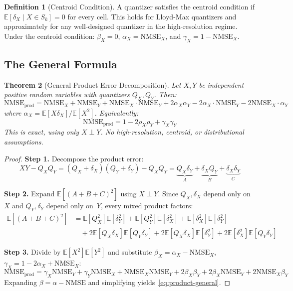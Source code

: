 \documentclass[11pt,letterpaper]{article}
\newtheorem{theorem}{Theorem}[section]
\theoremstyle{definition}
\newtheorem{definition}[theorem]{Definition}
\theoremstyle{remark}
\newcommand{\NMSE}{\mathrm{NMSE}}
\newcommand{\E}{\mathbb{E}}
\begin{document}
\begin{definition}[Centroid Condition]
\label{def:centroid}
A quantizer satisfies the centroid condition if
$\E[\delta_X \mid X \in S_k] = 0$ for every cell.
This holds for Lloyd-Max quantizers and approximately for any well-designed
quantizer in the high-resolution regime.
Under the centroid condition:
$\beta_X = 0$, $\alpha_X = \NMSE_X$, and $\gamma_X = 1 - \NMSE_X$.
\end{definition}

\subsection{The General Formula}

\begin{theorem}[General Product Error Decomposition]
\label{thm:product-general}
Let $X, Y$ be independent positive random variables with quantizers
$Q_X, Q_Y$.
Then:
\begin{equation}
  \boxed{\NMSE_{\mathrm{prod}} = \NMSE_X + \NMSE_Y + \NMSE_X \cdot \NMSE_Y
  + 2\alpha_X \alpha_Y
  - 2\alpha_X \cdot \NMSE_Y - 2\NMSE_X \cdot \alpha_Y}
  \label{eq:product-general}
\end{equation}
where $\alpha_X = \E[X\delta_X]/\E[X^2]$.
Equivalently:
\begin{equation}
  \NMSE_{\mathrm{prod}} = 1 - 2\rho_X \rho_Y + \gamma_X \gamma_Y
  \label{eq:product-rho-gamma}
\end{equation}
This is exact, using only $X \perp Y$.
No high-resolution, centroid, or distributional assumptions.
\end{theorem}

\begin{proof}
\textbf{Step 1.} Decompose the product error:
\[
  XY - Q_X Q_Y = (Q_X + \delta_X)(Q_Y + \delta_Y) - Q_X Q_Y
  = \underbrace{Q_X \delta_Y}_{A}
  + \underbrace{\delta_X Q_Y}_{B}
  + \underbrace{\delta_X \delta_Y}_{C}
\]

\textbf{Step 2.} Expand $\E[(A+B+C)^2]$ using $X \perp Y$.
Since $Q_X, \delta_X$ depend only on~$X$ and $Q_Y, \delta_Y$ depend only
on~$Y$, every mixed product factors:
\begin{align*}
  \E[(A+B+C)^2]
  &= \E[Q_X^2]\E[\delta_Y^2] + \E[Q_Y^2]\E[\delta_X^2]
     + \E[\delta_X^2]\E[\delta_Y^2] \\
  &\quad + 2\E[Q_X\delta_X]\E[Q_Y\delta_Y]
     + 2\E[Q_X\delta_X]\E[\delta_Y^2]
     + 2\E[\delta_X^2]\E[Q_Y\delta_Y]
\end{align*}

\textbf{Step 3.} Divide by $\E[X^2]\E[Y^2]$ and substitute
$\beta_X = \alpha_X - \NMSE_X$,
$\gamma_X = 1 - 2\alpha_X + \NMSE_X$:
\[
  \NMSE_{\mathrm{prod}} = \gamma_X \NMSE_Y + \gamma_Y \NMSE_X
  + \NMSE_X \NMSE_Y
  + 2\beta_X \beta_Y + 2\beta_X \NMSE_Y + 2\NMSE_X \beta_Y
\]
Expanding $\beta = \alpha - \NMSE$ and simplifying
yields~\eqref{eq:product-general}.
\end{proof}
\end{document}
